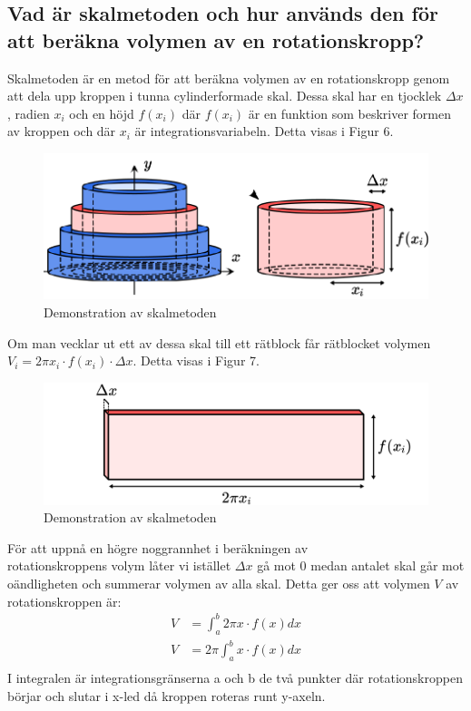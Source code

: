 \documentclass[12pt]{article}
\begin{document}
\subsection*{Vad är skalmetoden och hur används den för att beräkna volymen av en rotationskropp?}
Skalmetoden är en metod för att beräkna volymen av en rotationskropp genom att dela upp kroppen i tunna cylinderformade skal. Dessa skal har en tjocklek $\Delta x$, radien $x_i$ och en höjd $f(x_i)$ där $f(x_i)$ är en funktion som beskriver formen av kroppen och där $x_i$ är integrationsvariabeln. Detta visas i Figur 6.
\begin{figure}[H]
    \centering
    \renewcommand{\thefigure}{6}
    \includegraphics[width=\textwidth]{figur6.png}
    \caption{Demonstration av skalmetoden}
\end{figure}
Om man vecklar ut ett av dessa skal till ett rätblock får rätblocket volymen $V_i=2\pi x_i\cdot f(x_i)\cdot \Delta x$. Detta visas i Figur 7.
\newpage
\begin{figure}[H]
    \centering
    \renewcommand{\thefigure}{7}
    \includegraphics[width=\textwidth]{figur7.png}
    \caption{Demonstration av skalmetoden}
\end{figure}
För att uppnå en högre noggrannhet i beräkningen av\\
rotationskroppens volym låter vi istället $\Delta x$ gå mot 0 medan antalet skal går mot oändligheten och summerar volymen av alla skal. Detta ger oss att volymen $V$ av 
rotationskroppen är:
\begin{align*}
    V&=\int_{a}^{b}2\pi x\cdot f(x) dx\\
    V&=2\pi\int_{a}^{b}x\cdot f(x) dx\\
\end{align*}
I integralen är integrationsgränserna a och b de två punkter där rotationskroppen börjar och slutar i x-led då kroppen roteras runt y-axeln.\\
\end{document}

